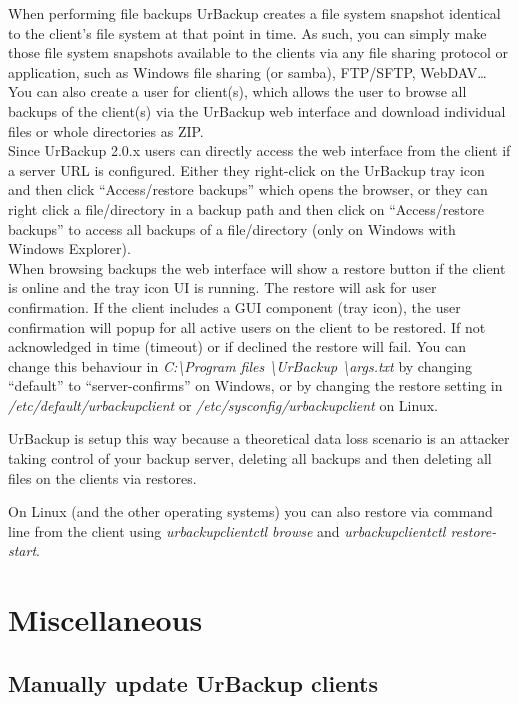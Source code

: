 \documentclass[a4paper,10pt]{article}
\begin{document}
When performing file backups UrBackup creates a file system snapshot identical to the client's file system at that point in time. As such, you can simply make those file system snapshots available to the clients via any file sharing protocol or application, such as Windows file sharing (or samba), FTP/SFTP, WebDAV\ldots\\

You can also create a user for client(s), which allows the user to browse all backups of the client(s) via the UrBackup web interface and download individual files or whole directories as ZIP.\\

Since UrBackup 2.0.x users can directly access the web interface from the client if a server URL is configured. Either they right-click on the UrBackup tray icon and then click ``Access/restore backups'' which opens the browser, or they can right click a file/directory in a backup path and then click on ``Access/restore backups'' to access all backups of a file/directory (only on Windows with Windows Explorer).\\

When browsing backups the web interface will show a restore button if the client is online and the tray icon UI is running. The restore will ask for user confirmation. If the client includes a GUI component (tray icon), the user confirmation will popup for all active users on the client to be restored. If not acknowledged in time (timeout) or if declined the restore will fail. 
You can change this behaviour in \textsl{C:\textbackslash Program files \textbackslash UrBackup \textbackslash args.txt} by changing ``default'' to ``server-confirms'' on Windows, or by changing the restore setting in \textsl{/etc/default/urbackupclient} or \textsl{/etc/sysconfig/urbackupclient} on Linux.

UrBackup is setup this way because a theoretical data loss scenario is an attacker taking control of your backup server, deleting all backups and then deleting all files on the clients via restores.  

On Linux (and the other operating systems) you can also restore via command line from the client using \textsl{urbackupclientctl browse} and \textsl{urbackupclientctl restore-start}.

\section{Miscellaneous}

\subsection{Manually update UrBackup clients}
\label{subsec:manually_update_client}
\end{document}
